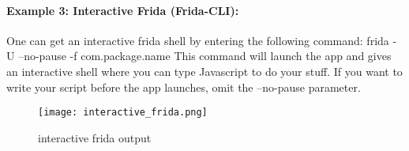 \documentclass[../main.tex]{subfile}
\begin{document}
	
	\paragraph{Example 3: Interactive Frida (Frida-CLI):}
	One can get an interactive frida shell by entering the following command:
	frida -U --no-pause -f com.package.name
	This command will launch the app and gives an interactive shell where you can type Javascript to do your stuff. If you want to write your
	script before the app launches, omit the --no-pause parameter.
	\begin{figure}
		\texttt{[image: interactive\_frida.png]}
		\caption{interactive frida output }
		\label{fig:interactive_frida}
	\end{figure}
	
\end{document}
